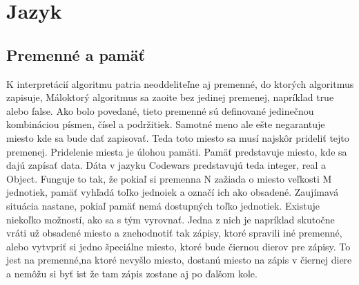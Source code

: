 \section{Jazyk}
\subsection{Premenné a pamäť}
K interpretácií algoritmu patria neoddeliteľne aj premenné, do ktorých algoritmus zapisuje, Máloktorý algoritmus sa zaoite bez jedinej premenej, napríklad true alebo false. Ako bolo povedané, tieto premenné sú definované jedinečnou kombináciou písmen, čísel a podržitiek. Samotné meno ale ešte negarantuje miesto kde sa bude dať zapisovať. Teda toto miesto sa musí najskôr prideliť tejto premenej. Pridelenie miesta je úlohou pamäti. 
Pamäť predstavuje miesto, kde sa dajú zapísať data. Dáta v jazyku Codewars predstavujú teda integer, real a Object. Funguje to tak, že pokiaľ si premenna N zažiada o miesto veľkosti M jednotiek, pamäť vyhľadá toľko jednoiek a označí ich ako obsadené. Zaujímavá situácia nastane, pokiaľ pamäť nemá dostupných toľko jednotiek. Existuje niekoľko možností, ako sa s tým vyrovnať. Jedna z nich je napríklad skutočne vráti už obsadené miesto a znehodnotiť tak zápisy, ktoré spravili iné premenné, alebo vytvpriť si jedno špeciálne miesto, ktoré bude čiernou dierov pre zápisy. To jest na premenné,na ktoré nevyšlo miesto, dostanú miesto na zápis v čiernej diere a nemôžu si byť ist že tam zápis zostane aj po ďalšom kole.
